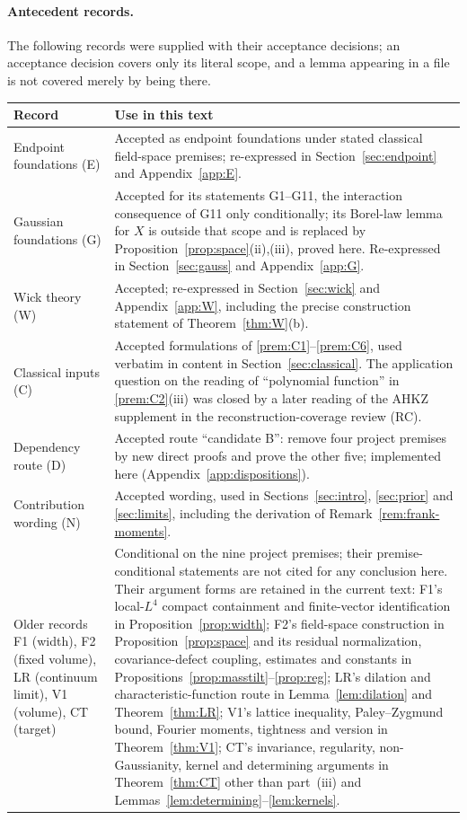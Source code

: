 \documentclass[11pt]{article}
\theoremstyle{plain}
\theoremstyle{definition}
\theoremstyle{remark}
\begin{document}
\paragraph{Antecedent records.} The following records were supplied with
their acceptance decisions; an acceptance decision covers only its literal
scope, and a lemma appearing in a file is not covered merely by being there.
{\small
\begin{longtable}{@{}p{}p{}@{}}
\toprule
Record & Use in this text\\
\midrule
Endpoint foundations (E) & Accepted as endpoint foundations under stated classical field-space premises; re-expressed in Section~\ref{sec:endpoint} and Appendix~\ref{app:E}.\\
Gaussian foundations (G) & Accepted for its statements G1--G11, the interaction consequence of G11 only conditionally; its Borel-law lemma for $X$ is outside that scope and is replaced by Proposition~\ref{prop:space}(ii),(iii), proved here. Re-expressed in Section~\ref{sec:gauss} and Appendix~\ref{app:G}.\\
Wick theory (W) & Accepted; re-expressed in Section~\ref{sec:wick} and Appendix~\ref{app:W}, including the precise construction statement of Theorem~\ref{thm:W}(b).\\
Classical inputs (C) & Accepted formulations of \ref{prem:C1}--\ref{prem:C6}, used verbatim in content in Section~\ref{sec:classical}. The application question on the reading of ``polynomial function'' in \ref{prem:C2}(iii) was closed by a later reading of the AHKZ supplement in the reconstruction-coverage review (RC).\\
Dependency route (D) & Accepted route ``candidate B'': remove four project premises by new direct proofs and prove the other five; implemented here (Appendix~\ref{app:dispositions}).\\
Contribution wording (N) & Accepted wording, used in Sections~\ref{sec:intro}, \ref{sec:prior} and \ref{sec:limits}, including the derivation of Remark~\ref{rem:frank-moments}.\\
Older records F1 (width), F2 (fixed volume), LR (continuum limit), V1 (volume), CT (target) & Conditional on the nine project premises; their premise-conditional statements are not cited for any conclusion here. Their argument forms are retained in the current text: F1's local-$L^{4}$ compact containment and finite-vector identification in Proposition~\ref{prop:width}; F2's field-space construction in Proposition~\ref{prop:space} and its residual normalization, covariance-defect coupling, estimates and constants in Propositions~\ref{prop:masstilt}--\ref{prop:reg}; LR's dilation and characteristic-function route in Lemma~\ref{lem:dilation} and Theorem~\ref{thm:LR}; V1's lattice inequality, Paley--Zygmund bound, Fourier moments, tightness and version in Theorem~\ref{thm:V1}; CT's invariance, regularity, non-Gaussianity, kernel and determining arguments in Theorem~\ref{thm:CT} other than part~(iii) and Lemmas~\ref{lem:determining}--\ref{lem:kernels}.\\

\end{longtable}}
\end{document}
